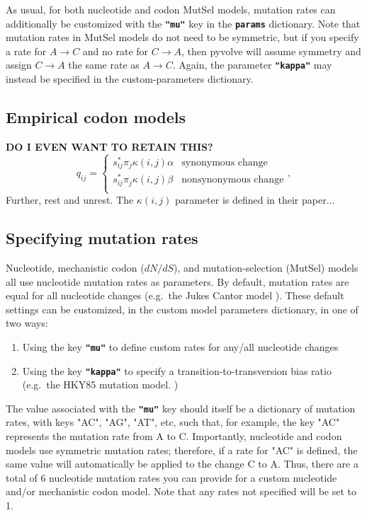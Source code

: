 \documentclass{article}
\newcommand{\code}[1]{\textbf{\texttt{\small{#1}}}}
\begin{document}
As usual, for both nucleotide and codon MutSel models, mutation rates can additionally be customized with the \code{"mu"} key in the \code{params} dictionary. Note that mutation rates in MutSel models do not need to be symmetric, but if you specify a rate for $A \rightarrow C$ and no rate for $C \rightarrow A$, then pyvolve will assume symmetry and assign $C \rightarrow A$ the same rate as $A \rightarrow C$. Again, the parameter \code{"kappa"} may instead be specified in the custom-parameters dictionary.


\subsection{Empirical codon models}\label{sec:ecm_basic}
\textbf{DO I EVEN WANT TO RETAIN THIS?}
\begin{equation}\label{eq:ecmrest}
q_{ij} = \left\{ 
\begin{array}{rl}
s^\ast_{ij} \pi_j \kappa(i,j) \alpha      &\text{synonymous change} \\
s^\ast_{ij} \pi_j \kappa(i,j) \beta       &\text{nonsynonymous change} \\
\end{array} \right.,
\end{equation}
Further, rest and unrest. The $\kappa(i,j)$ parameter is defined in their paper...

\subsection{Specifying mutation rates}\label{sec:mu}

Nucleotide, mechanistic codon ($dN/dS$), and mutation-selection (MutSel) models all use nucleotide mutation rates as parameters. By default, mutation rates are equal for all nucleotide changes (e.g.\ the Jukes Cantor model \citep{JC69}). These default settings can be customized, in the custom model parameters dictionary, in one of two ways:
\begin{enumerate}
	\item Using the key \code{"mu"} to define custom rates for any/all nucleotide changes
	\item Using the key \code{"kappa"} to specify a transition-to-transversion bias ratio (e.g.\ the HKY85 mutation model. \citep{HKY85})
\end{enumerate}
The value associated with the \code{"mu"} key should itself be a dictionary of mutation rates, with keys "AC", "AG", "AT", etc, such that, for example, the key "AC" represents the mutation rate from A to C. Importantly, nucleotide and codon models use symmetric mutation rates; therefore, if a rate for "AC" is defined, the same value will automatically be applied to the change C to A. Thus, there are a total of 6 nucleotide mutation rates you can provide for a custom nucleotide and/or mechanistic codon model. Note that any rates not specified will be set to 1.
\end{document}
